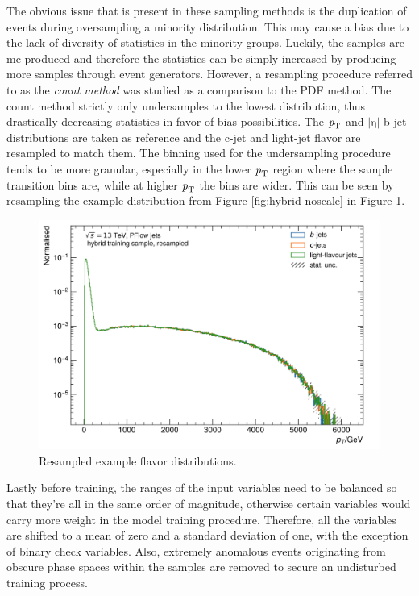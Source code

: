 The obvious issue that is present in these sampling methods is the duplication of events during oversampling a minority distribution. This may cause 
a bias due to the lack of diversity of statistics in the minority groups. Luckily, the samples are \gls{mc} produced and therefore the statistics can be
simply increased by producing more samples through event generators. However, a resampling procedure referred to as the \textit{count method} was studied as a comparison
to the PDF method. The count method strictly only undersamples to the lowest distribution, thus drastically decreasing statistics in favor of bias possibilities. 
The $\textrm{\textit{p}}_{\textrm{T}}$ and $|\textrm{η}|$ b-jet distributions are taken as 
reference and the c-jet and light-jet flavor are resampled to match them. The binning used for the undersampling procedure tends to be more granular, especially 
in the lower $\textrm{\textit{p}}_{\textrm{T}}$ region where the sample transition bins are, while at higher $\textrm{\textit{p}}_{\textrm{T}}$ the bins are wider. This can 
be seen by resampling the example distribution from Figure \ref{fig:hybrid-noscale} in Figure \ref{fig:hybrid-scaled}.

\begin{figure}[h]
    \centering
    \includegraphics[scale=0.35]{figs/ch5/hybrid-scaled.png}
    \caption{ Resampled example flavor distributions.}
\label{fig:hybrid-scaled}
\end{figure}

Lastly before training, the ranges of the input variables need to be balanced so that they're all in the same order of magnitude, otherwise certain 
variables would carry more weight in the model training procedure. Therefore, all the variables are shifted to a mean of zero and a standard deviation 
of one, with the exception of binary check variables. Also, extremely anomalous events originating from obscure phase spaces within the samples are 
removed to secure an undisturbed training process.

